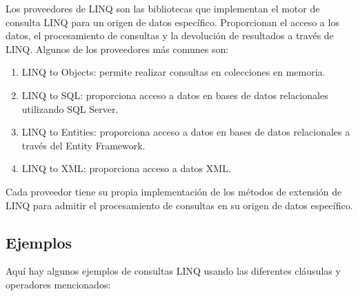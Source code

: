 \documentclass[executivepaper]{article}
\begin{document}
Los proveedores de LINQ son las bibliotecas que implementan el motor de consulta LINQ para un origen de datos específico. Proporcionan el acceso a los datos, el procesamiento de consultas y la devolución de resultados a través de LINQ. Algunos de los proveedores más comunes son:
\begin{enumerate}
    \item LINQ to Objects: permite realizar consultas en colecciones en memoria.
    \item LINQ to SQL: proporciona acceso a datos en bases de datos relacionales utilizando SQL Server.
    \item LINQ to Entities: proporciona acceso a datos en bases de datos relacionales a través del Entity Framework.
    \item LINQ to XML: proporciona acceso a datos XML.
\end{enumerate}
Cada proveedor tiene su propia implementación de los métodos de extensión de LINQ para admitir el procesamiento de consultas en su origen de datos específico.

\subsection{Ejemplos}

Aquí hay algunos ejemplos de consultas LINQ usando las diferentes cláusulas y operadores mencionados:
\end{document}
